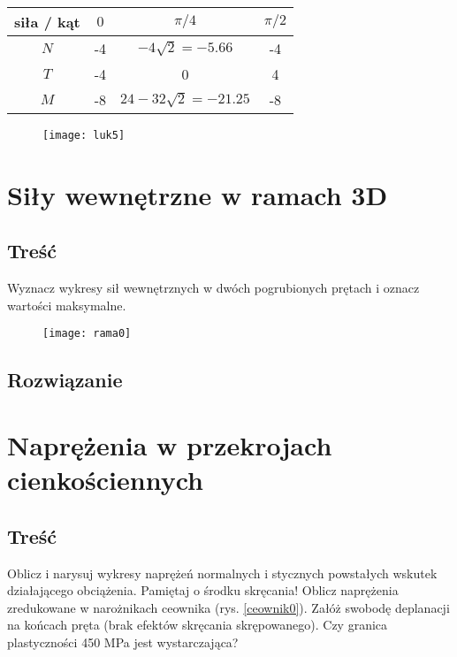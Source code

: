 \documentclass[a4paper,11pt]{article}
\begin{document}
\begin{table}[tbh]\centering
	\begin{tabular}{|c|ccc|}\hline
		siła / kąt & $0$ & $\pi/4$ & $\pi/2$ \\ \hline
		$N$ & -4 & $-4\sqrt{2}=-5.66$ & -4 \\
		$T$ & -4 & 0 & 4 \\
		$M$ & -8 & $24-32\sqrt{2}=-21.25$ & -8 \\ \hline
	\end{tabular}
	\caption{}
	\label{luk}
\end{table}

\begin{figure}[tbh]\centering
	\texttt{[image: luk5]}
	\caption{}
	\label{luk5}
\end{figure}

\FloatBarrier
\clearpage

\section{Siły wewnętrzne w ramach 3D}
\subsection{Treść}
Wyznacz wykresy sił wewnętrznych w dwóch pogrubionych prętach i oznacz wartości maksymalne.

\begin{figure}[tbh]\centering
	\texttt{[image: rama0]}
	\caption{}
	\label{rama0}
\end{figure}

\subsection{Rozwiązanie}

\FloatBarrier
\clearpage

\section{Naprężenia w przekrojach cienkościennych}
\subsection{Treść}
Oblicz i narysuj wykresy naprężeń normalnych i stycznych powstałych wskutek działającego obciążenia. Pamiętaj o środku skręcania! Oblicz naprężenia zredukowane w narożnikach ceownika (rys. \ref{ceownik0}). Załóż swobodę deplanacji na końcach pręta (brak efektów skręcania skrępowanego). Czy granica plastyczności 450 MPa jest wystarczająca?
\end{document}
